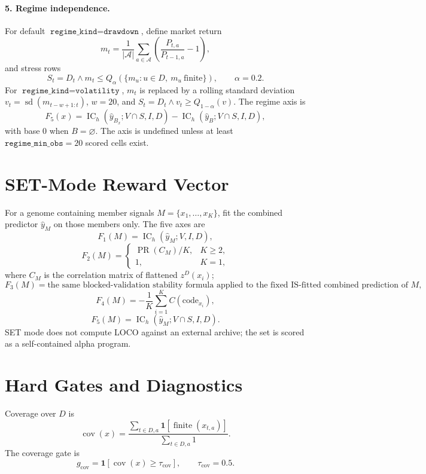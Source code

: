 \documentclass[11pt]{article}
\newcommand{\IC}{\operatorname{IC}}
\newcommand{\PR}{\operatorname{PR}}
\newcommand{\finite}{\operatorname{finite}}
\newcommand{\ind}{\mathbf{1}}
\begin{document}
\paragraph{5. Regime independence.}
For default \(\texttt{regime\_kind}=\texttt{drawdown}\), define market return
\[
  m_t=\frac{1}{|\mathcal A|}\sum_{a\in\mathcal A}\left(\frac{P_{t,a}}{P_{t-1,a}}-1\right),
\]
and stress rows
\[
  S_t=D_t\land
  m_t\le Q_{\alpha}\left(\{m_u:u\in D,\ m_u\ \mathrm{finite}\}\right),
  \qquad \alpha=0.2.
\]
For \(\texttt{regime\_kind}=\texttt{volatility}\), \(m_t\) is replaced by a rolling
standard deviation \(v_t=\operatorname{sd}(m_{t-w+1:t})\), \(w=20\), and
\(S_t=D_t\land v_t\ge Q_{1-\alpha}(v)\).  The regime axis is
\[
  F_5(x)
  =
  \IC_h(\widehat y_{B_x};V\cap S,I,D)
  -
  \IC_h(\widehat y_B;V\cap S,I,D),
\]
with base \(0\) when \(B=\varnothing\).  The axis is undefined unless at least
\(\texttt{regime\_min\_obs}=20\) scored cells exist.

\section*{SET-Mode Reward Vector}

For a genome containing member signals \(M=\{x_1,\dots,x_K\}\), fit the combined
predictor \(\widehat y_M\) on those members only.  The five axes are
\[
  F_1(M)=\IC_h(\widehat y_M;V,I,D),
\]
\[
  F_2(M)=
  \begin{cases}
    \PR(C_M)/K, & K\ge 2,\\
    1, & K=1,
  \end{cases}
\]
where \(C_M\) is the correlation matrix of flattened \(z^D(x_i)\);
\[
  F_3(M)=\text{the same blocked-validation stability formula applied to the fixed}
  \text{ IS-fitted combined prediction of }M,
\]
\[
  F_4(M)=
  -\frac{1}{K}\sum_{i=1}^{K} C(\text{code}_{x_i}),
\]
\[
  F_5(M)=\IC_h(\widehat y_M;V\cap S,I,D).
\]
SET mode does not compute LOCO against an external archive; the set is scored as
a self-contained alpha program.

\section*{Hard Gates and Diagnostics}

Coverage over \(D\) is
\[
  \operatorname{cov}(x)=
  \frac{\sum_{t\in D,a}\ind[\finite(x_{t,a})]}
       {\sum_{t\in D,a}1}.
\]
The coverage gate is
\[
  g_{\mathrm{cov}}=\ind[\operatorname{cov}(x)\ge \tau_{\mathrm{cov}}],
  \qquad \tau_{\mathrm{cov}}=0.5.
\]
\end{document}
